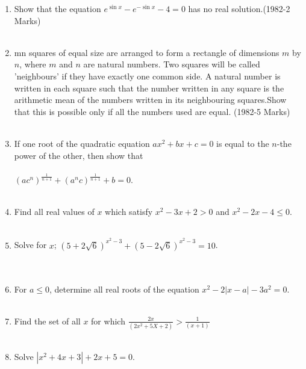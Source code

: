 \documentclass[journal,12pt,twocolumn]{IEEEtran}
\theoremstyle{remark}
\begin{document}
\begin{enumerate}[start=13]
\item Show that the equation $e^{\sin{x}}-e^{-\sin{x}}-4=0$ has no real solution.\hfill{(1982-2 Marks)}\\\\
\item mn squares of equal size are arranged to form a rectangle of dimensions $m$ by $n$, where $m$ and $n$ are natural numbers. Two squares will be called 'neighbours' if they have exactly one common side. A natural number is written in each square such that the number written in any square is the arithmetic mean of the numbers written in its neighbouring squares.Show that this is possible only if all the numbers used are equal. \hfill{(1982-5 Marks)}\\\\
\item If one root of the quadratic equation $ax^2+bx+c=0$ is equal to the $n$-the power of the other, then show that\\\\
$(ac^n)^\frac{1}{n+1} +(a^nc)^\frac{1}{n+1}+b=0$. \hspace*{\fill}\\\\
 \item Find all real values of $x$ which satisfy $x^2-3x+2>0$ and $x^2-2x-4\leq 0$.\hspace*{\fill}\\\\
 \item Solve for $x$; $(5+2\sqrt{6})^{x^2-3}+(5-2\sqrt{6})^{x^2-3}=10$.\\ \hspace*{\fill}\\\\
 \item For $a \leq 0$, determine all real roots of the equation $x^2-2| x-a |-3a^2=0$. \hspace*{\fill}\\\\
 \item Find the set of all $x$ for which $\frac{2x}{(2x^2+5X+2)}>\frac{1}{(x+1)}$ \hspace*{\fill}\\\\
 \item Solve $| x^2+4x+3 |+2x+5=0$. \hspace*{\fill}\\\\

\end{enumerate}
\end{document}
